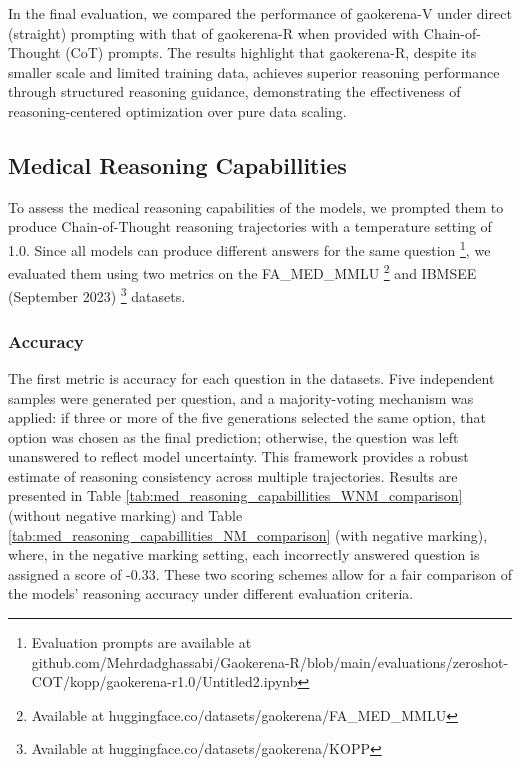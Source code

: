 \documentclass[conference]{IEEEtran}
\begin{document}
In the final evaluation, we compared the performance of gaokerena-V under direct (straight) prompting with that of gaokerena-R when provided with Chain-of-Thought (CoT) prompts. The results highlight that gaokerena-R, despite its smaller scale and limited training data, achieves superior reasoning performance through structured reasoning guidance, demonstrating the effectiveness of reasoning-centered optimization over pure data scaling.
          \subsection{Medical Reasoning Capabillities}
To assess the medical reasoning capabilities of the models, we prompted them to produce Chain-of-Thought reasoning trajectories with a temperature setting of 1.0.  
Since all models can produce different answers for the same question
\footnote{Evaluation prompts are available at github.com/Mehrdadghassabi/Gaokerena-R/blob/main/evaluations/zeroshot-COT/kopp/gaokerena-r1.0/Untitled2.ipynb},
we evaluated them using two metrics on the FA\_MED\_MMLU
\footnote{Available at huggingface.co/datasets/gaokerena/FA\_MED\_MMLU} 
and IBMSEE (September 2023)
\footnote{Available at huggingface.co/datasets/gaokerena/KOPP}
datasets.

              \subsubsection{Accuracy}
The first metric is accuracy for each question in the datasets. Five independent samples were generated per question, and a majority-voting mechanism was applied: if three or more of the five generations selected the same option, that option was chosen as the final prediction; otherwise, the question was left unanswered to reflect model uncertainty.  
This framework provides a robust estimate of reasoning consistency across multiple trajectories.  
Results are presented in Table
\ref{tab:med_reasoning_capabillities_WNM_comparison} (without negative marking) and Table
\ref{tab:med_reasoning_capabillities_NM_comparison} (with negative marking), where, in the negative marking setting, each incorrectly answered question is assigned a score of -0.33.  
These two scoring schemes allow for a fair comparison of the models’ reasoning accuracy under different evaluation criteria.
\end{document}
